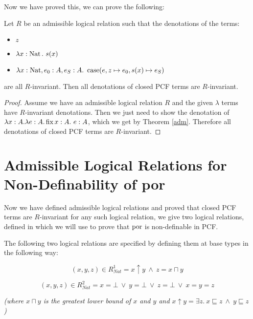 
Now we have proved this, we can prove the following:

\vspace{0.5cm}

\begin{thm}{\citep{Streicher06}}\label{t13}
Let $R$ be an admissible logical relation such that the denotations of the terms:

\begin{itemize}
\item{$z$}
\item{$\lambda x: \nat. \ s(x)$}
\item{$\lambda x: \operatorname{Nat}, e_0 : A, e_S: A. \ \operatorname{case}(e,z \mapsto e_0,s(x) \mapsto e_S)$}
\end{itemize}

are all $R$-invariant. Then all denotations of closed PCF terms are $R$-invariant.
\end{thm}

\begin{proof}
Assume we have an admissible logical relation $R$ and the given $\lambda$ terms have $R$-invariant denotations. Then we just need to show the denotation of $\lambda x : A. \lambda e : A. \operatorname{fix} x : A. \ e : A$, which we get by Theorem \ref{adm}. Therefore all denotations of closed PCF terms are $R$-invariant.
\end{proof}

\section{Admissible Logical Relations for Non-Definability of por}\label{exercise}

Now we have defined admissible logical relations and proved that closed PCF terms are $R$-invariant for any such logical relation, we give two logical relations, defined in \citep{Streicher06} which we will use to prove that $\operatorname{por}$ is non-definable in PCF.

The following two logical relations are specified by defining them at base types in the following way:

\[ (x,y,z) \in {R^1_{Nat}} = x \uparrow y \ \wedge \ z = x \sqcap y\]

\[ (x,y,z) \in {R^2_{Nat}} = x = \bot \ \vee \ y = \bot \ \vee \ z = \bot \ \vee \ x=y=z \]

\emph{(where $x \sqcap y$ is the greatest lower bound of $x$ and $y$ and $x \uparrow y = \exists z. \ x \sqsubseteq z \ \wedge \ y \sqsubseteq z$)}

